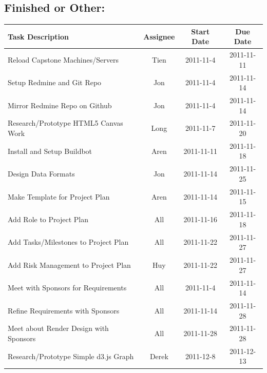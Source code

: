 \documentclass[12pt, letterpaper]{article}
\begin{document}
	\subsection{Finished or Other:}

  \begin{center}
    \begin{tabular}{| p{8.3cm} || c | c | c | }
      \hline
      Task Description & Assignee & Start Date & Due Date \\
      \hline
			Reload Capstone Machines/Servers & Tien & 2011-11-4 & 2011-11-11\\
			Setup Redmine and Git Repo & Jon & 2011-11-4 & 2011-11-14 \\
			Mirror Redmine Repo on Github & Jon & 2011-11-4 & 2011-11-14 \\
			Research/Prototype HTML5 Canvas Work & Long & 2011-11-7 & 2011-11-20 \\
      Install and Setup Buildbot & Aren & 2011-11-11 & 2011-11-18 \\
            Design Data Formats & Jon & 2011-11-14 & 2011-11-25 \\
      Make Template for Project Plan & Aren & 2011-11-14 & 2011-11-15 \\
			Add Role to Project Plan & All & 2011-11-16 & 2011-11-18 \\
			Add Tasks/Milestones to Project Plan & All & 2011-11-22 & 2011-11-27\\
			Add Risk Management to Project Plan & Huy & 2011-11-22 & 2011-11-27\\
			Meet with Sponsors for Requirements & All & 2011-11-4 & 2011-11-14\\
			Refine Requirements with Sponsors & All & 2011-11-14 & 2011-11-28\\
			Meet about Render Design with Sponsors & All & 2011-11-28 & 2011-11-28 \\
            Research/Prototype Simple d3.js Graph & Derek & 2011-12-8 & 2011-12-13 \\
      \hline
    \end{tabular}
  \end{center}
\end{document}
